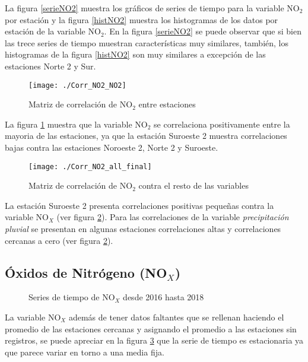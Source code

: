 La figura \ref{serieNO2} muestra los gráficos de series de tiempo para la variable NO$_{2}$ por estación y la figura \ref{histNO2} muestra los histogramas de los datos por estación de la variable NO$_{2}$. En la figura \ref{serieNO2} se puede observar que si bien las trece series de tiempo muestran características muy similares, también,  los histogramas de la figura \ref{histNO2} son muy similares a excepción de las estaciones Norte 2 y Sur.

\begin{figure}[H]
\centering
\texttt{[image: ./Corr\_NO2\_NO2]}
\caption{Matriz de correlación de NO$_{2}$ entre estaciones }
\label{corrNO2NO2}
\end{figure}

La figura \ref{corrNO2NO2} muestra que la variable NO$_{2}$ se correlaciona positivamente entre la mayoria de las estaciones, ya que la estación Suroeste 2 muestra correlaciones bajas contra las estaciones Noroeste 2, Norte 2 y Suroeste.

\begin{figure}[H]
\centering
\texttt{[image: ./Corr\_NO2\_all\_final]}
\caption{Matriz de correlación de NO$_{2}$ contra el resto de las variables}
\label{corrNO2}
\end{figure}

La estación Suroeste 2 presenta correlaciones positivas pequeñas contra la variable NO$_{X}$ (ver figura \ref{corrNO2}). Para las correlaciones de la variable {\em precipitación pluvial} se presentan en algunas estaciones correlaciones altas y correlaciones cercanas a cero (ver figura \ref{corrNO2}).






\subsection{Óxidos de Nitrógeno (NO$_{X}$)}
\begin{figure}[H]
\centering
{}
\caption{Series de tiempo de NO$_{X}$ desde 2016 hasta 2018}
\label{serieNOX}
\end{figure}

La variable NO$_{X}$ además de tener datos faltantes que se rellenan haciendo el promedio de las estaciones cercanas y asignando el promedio a las estaciones sin registros, se puede apreciar en la figura \ref{serieNOX} que la serie de tiempo es estacionaria ya que parece variar en torno a una media fija.

